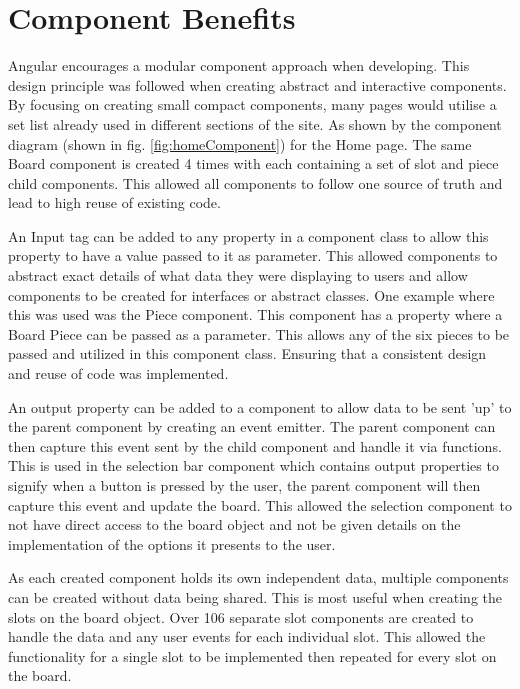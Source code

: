 \documentclass{l4proj}
\begin{document}
 

\section{Component Benefits}
Angular encourages a modular component approach when developing. This design principle was followed when creating abstract and interactive components. By focusing on creating small compact components, many pages would utilise a set list already used in different sections of the site. As shown by the component diagram (shown in fig. \ref{fig:homeComponent}) for the Home page. The same Board component is created 4 times with each containing a set of slot and piece child components. This allowed all components to follow one source of truth and lead to high reuse of existing code. 

An Input tag can be added to any property in a component class to allow this property to have a value passed to it as parameter. This allowed components to abstract exact details of what data they were displaying to users and allow components to be created for interfaces or abstract classes. One example where this was used was the Piece component. This component has a property where a Board Piece can be passed as a parameter. This allows any of the six pieces to be passed and utilized in this component class. Ensuring that a consistent design and reuse of code was implemented. 

An output property can be added to a component to allow data to be sent 'up' to the parent component by creating an event emitter. The parent component can then capture this event sent by the child component and handle it via functions. This is used in the selection bar component which contains output properties to signify when a button is pressed by the user, the parent component will then capture this event and update the board. This allowed the selection component to not have direct access to the board object and not be given details on the implementation of the options it presents to the user. 

As each created component holds its own independent data, multiple components can be created without data being shared. This is most useful when creating the slots on the board object. Over 106 separate slot components are created to handle the data and any user events for each individual slot. This allowed the functionality for a single slot to be implemented then repeated for every slot on the board.
\end{document}
